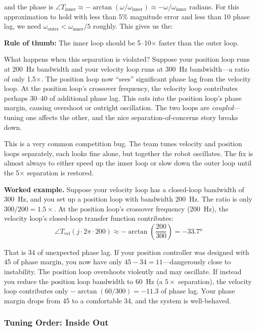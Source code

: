 and the phase is $\angle T_{\text{inner}} \approx -\arctan(\omega/\omega_{\text{inner}}) \approx -\omega/\omega_{\text{inner}}$ radians. For this approximation to hold with less than 5\% magnitude error and less than 10\textdegree{} phase lag, we need $\omega_{\text{outer}} < \omega_{\text{inner}} / 5$ roughly. This gives us the:

\textbf{Rule of thumb:} The inner loop should be 5--10$\times$ faster than the outer loop.

What happens when this separation is violated? Suppose your position loop runs at 200~Hz bandwidth and your velocity loop runs at 300~Hz bandwidth---a ratio of only 1.5$\times$. The position loop now ``sees'' significant phase lag from the velocity loop. At the position loop's crossover frequency, the velocity loop contributes perhaps 30--40\textdegree{} of additional phase lag. This eats into the position loop's phase margin, causing overshoot or outright oscillation. The two loops are \textit{coupled}---tuning one affects the other, and the nice separation-of-concerns story breaks down.

This is a very common competition bug. The team tunes velocity and position loops separately, each looks fine alone, but together the robot oscillates. The fix is almost always to either speed up the inner loop or slow down the outer loop until the 5$\times$ separation is restored.

\textbf{Worked example.} Suppose your velocity loop has a closed-loop bandwidth of 300~Hz, and you set up a position loop with bandwidth 200~Hz. The ratio is only $300/200 = 1.5\times$. At the position loop's crossover frequency (200~Hz), the velocity loop's closed-loop transfer function contributes:
\[
\angle T_{\text{vel}}(j \cdot 2\pi \cdot 200) \approx -\arctan\!\left(\frac{200}{300}\right) = -33.7°
\]

That is 34\textdegree{} of unexpected phase lag. If your position controller was designed with 45\textdegree{} of phase margin, you now have only $45 - 34 = 11$\textdegree{}---dangerously close to instability. The position loop overshoots violently and may oscillate. If instead you reduce the position loop bandwidth to 60~Hz (a $5\times$ separation), the velocity loop contributes only $-\arctan(60/300) = -11.3$\textdegree{} of phase lag. Your phase margin drops from 45\textdegree{} to a comfortable 34\textdegree{}, and the system is well-behaved.

\subsubsection{Tuning Order: Inside Out}


